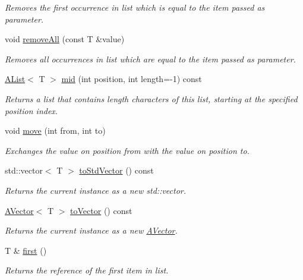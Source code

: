 \begin{DoxyCompactItemize}
\begin{DoxyCompactList}\small\item\em Removes the first occurrence in list which is equal to the item passed as parameter. \end{DoxyCompactList}\item 
void \mbox{\hyperlink{class_a_list_a32b8779cd05c79fe74f79c854b54a5f7}{remove\+All}} (const T \&value)
\begin{DoxyCompactList}\small\item\em Removes all occurrences in list which are equal to the item passed as parameter. \end{DoxyCompactList}\item 
\mbox{\hyperlink{class_a_list}{A\+List}}$<$ T $>$ \mbox{\hyperlink{class_a_list_a7b9c07f197f9017a7d231a8cf2f19f7b}{mid}} (int position, int length=-\/1) const
\begin{DoxyCompactList}\small\item\em Returns a list that contains length characters of this list, starting at the specified position index. \end{DoxyCompactList}\item 
void \mbox{\hyperlink{class_a_list_ac9979a4b71ae418f1ba7a36b2d9c1a77}{move}} (int from, int to)
\begin{DoxyCompactList}\small\item\em Exchanges the value on position from with the value on position to. \end{DoxyCompactList}\item 
std\+::vector$<$ T $>$ \mbox{\hyperlink{class_a_list_a53cbab789aed68750822a67ee6ae4d13}{to\+Std\+Vector}} () const
\begin{DoxyCompactList}\small\item\em Returns the current instance as a new std\+::vector. \end{DoxyCompactList}\item 
\mbox{\hyperlink{class_a_vector}{A\+Vector}}$<$ T $>$ \mbox{\hyperlink{class_a_list_a7be198818f6459df77cdc29a2f8d8d5e}{to\+Vector}} () const
\begin{DoxyCompactList}\small\item\em Returns the current instance as a new \mbox{\hyperlink{class_a_vector}{A\+Vector}}. \end{DoxyCompactList}\item 
T \& \mbox{\hyperlink{class_a_list_aca24663d0fe32d878cd4a214ade18372}{first}} ()
\begin{DoxyCompactList}\small\item\em Returns the reference of the first item in list. \end{DoxyCompactList}\item 

\end{DoxyCompactItemize}
